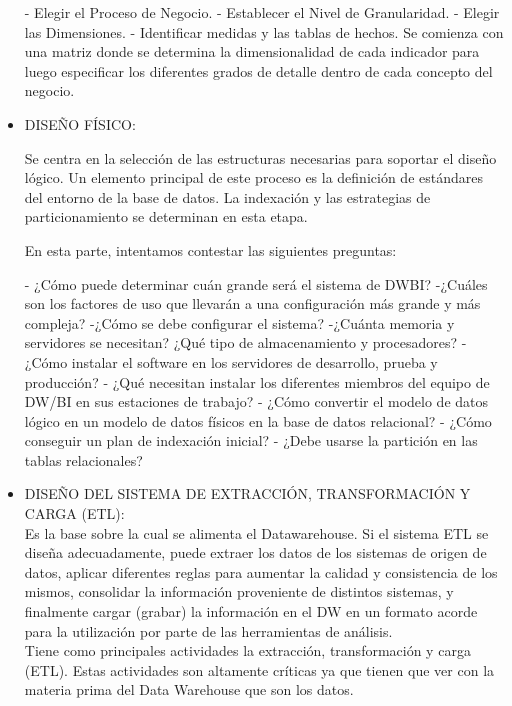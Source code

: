 \documentclass[preprint,12pt]{elsarticle}
\begin{document}
\begin{itemize}
- Elegir el Proceso de Negocio.
- Establecer el Nivel de Granularidad.
- Elegir las Dimensiones.
- Identificar medidas y las tablas de hechos.
Se comienza con una matriz donde se determina la dimensionalidad de cada indicador para luego especificar los diferentes grados de detalle dentro de cada concepto del negocio.

				\item DISEÑO FÍSICO: 

Se centra en la selección de las estructuras necesarias para soportar el diseño lógico. Un elemento principal de este proceso es la definición de estándares del entorno de la base de datos. La indexación y las estrategias de particionamiento se determinan en esta etapa.

En esta parte, intentamos contestar las siguientes preguntas: 

- ¿Cómo puede determinar cuán grande será el sistema de DW\/BI? 
-¿Cuáles son los factores de uso que llevarán a una configuración más grande y más compleja? 
-¿Cómo se debe configurar el sistema?
-¿Cuánta memoria y servidores se necesitan? ¿Qué tipo de almacenamiento y procesadores? 
- ¿Cómo instalar el software en los servidores de desarrollo, prueba y producción? 
- ¿Qué necesitan instalar los diferentes miembros del equipo de DW/BI en sus estaciones de trabajo? 
- ¿Cómo convertir el modelo de datos lógico en un modelo de datos físicos en la base de datos relacional? 
- ¿Cómo conseguir un plan de indexación inicial? 
- ¿Debe usarse la partición en las tablas relacionales?


				\item DISEÑO DEL SISTEMA DE EXTRACCIÓN, TRANSFORMACIÓN Y CARGA (ETL):  \\
				
				
				Es la base sobre la cual se alimenta el Datawarehouse. Si el sistema ETL se diseña adecuadamente, puede extraer los datos de los sistemas de origen de datos, aplicar diferentes reglas para aumentar la calidad y consistencia de los mismos, consolidar la información proveniente de distintos sistemas, y finalmente cargar (grabar) la información en el DW en un formato acorde para la utilización por parte de las herramientas de análisis. \\

Tiene como principales actividades la extracción, transformación y carga (ETL). Estas actividades son altamente críticas ya que tienen que ver con la materia prima del Data Warehouse que son los datos.\\



\end{itemize}
\end{document}
